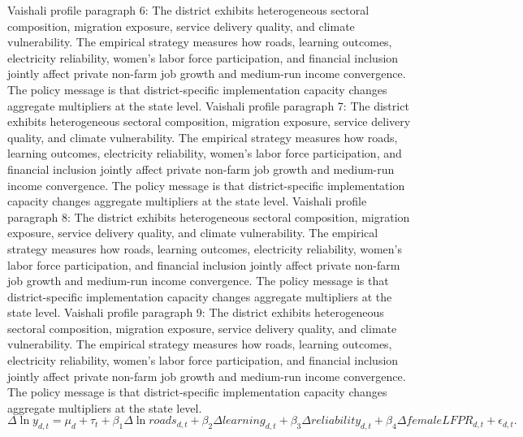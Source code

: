 \documentclass[preprint,12pt]{elsarticle}
\begin{document}
Vaishali profile paragraph 6: The district exhibits heterogeneous sectoral composition, migration exposure, service delivery quality, and climate vulnerability. The empirical strategy measures how roads, learning outcomes, electricity reliability, women's labor force participation, and financial inclusion jointly affect private non-farm job growth and medium-run income convergence. The policy message is that district-specific implementation capacity changes aggregate multipliers at the state level.
Vaishali profile paragraph 7: The district exhibits heterogeneous sectoral composition, migration exposure, service delivery quality, and climate vulnerability. The empirical strategy measures how roads, learning outcomes, electricity reliability, women's labor force participation, and financial inclusion jointly affect private non-farm job growth and medium-run income convergence. The policy message is that district-specific implementation capacity changes aggregate multipliers at the state level.
Vaishali profile paragraph 8: The district exhibits heterogeneous sectoral composition, migration exposure, service delivery quality, and climate vulnerability. The empirical strategy measures how roads, learning outcomes, electricity reliability, women's labor force participation, and financial inclusion jointly affect private non-farm job growth and medium-run income convergence. The policy message is that district-specific implementation capacity changes aggregate multipliers at the state level.
Vaishali profile paragraph 9: The district exhibits heterogeneous sectoral composition, migration exposure, service delivery quality, and climate vulnerability. The empirical strategy measures how roads, learning outcomes, electricity reliability, women's labor force participation, and financial inclusion jointly affect private non-farm job growth and medium-run income convergence. The policy message is that district-specific implementation capacity changes aggregate multipliers at the state level.
\begin{equation}\Delta \ln y_{d,t}=\mu_d+\tau_t+\beta_1\Delta\ln roads_{d,t}+\beta_2\Delta learning_{d,t}+\beta_3\Delta reliability_{d,t}+\beta_4\Delta femaleLFPR_{d,t}+\epsilon_{d,t}.\end{equation}
\end{document}
